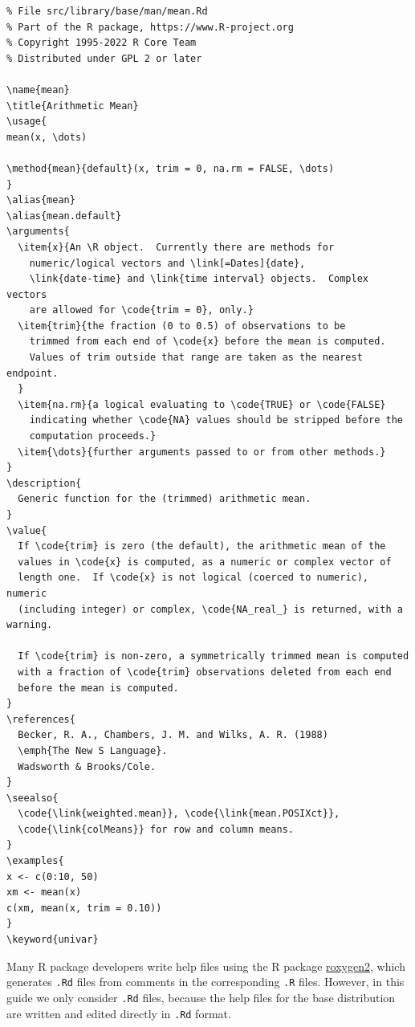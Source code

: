 \documentclass[
]{book}
\begin{document}
\begin{verbatim}
% File src/library/base/man/mean.Rd
% Part of the R package, https://www.R-project.org
% Copyright 1995-2022 R Core Team
% Distributed under GPL 2 or later

\name{mean}
\title{Arithmetic Mean}
\usage{
mean(x, \dots)

\method{mean}{default}(x, trim = 0, na.rm = FALSE, \dots)
}
\alias{mean}
\alias{mean.default}
\arguments{
  \item{x}{An \R object.  Currently there are methods for
    numeric/logical vectors and \link[=Dates]{date},
    \link{date-time} and \link{time interval} objects.  Complex vectors
    are allowed for \code{trim = 0}, only.}
  \item{trim}{the fraction (0 to 0.5) of observations to be
    trimmed from each end of \code{x} before the mean is computed.
    Values of trim outside that range are taken as the nearest endpoint.
  }
  \item{na.rm}{a logical evaluating to \code{TRUE} or \code{FALSE}
    indicating whether \code{NA} values should be stripped before the
    computation proceeds.} 
  \item{\dots}{further arguments passed to or from other methods.}
}
\description{
  Generic function for the (trimmed) arithmetic mean.
}
\value{
  If \code{trim} is zero (the default), the arithmetic mean of the
  values in \code{x} is computed, as a numeric or complex vector of
  length one.  If \code{x} is not logical (coerced to numeric), numeric
  (including integer) or complex, \code{NA_real_} is returned, with a warning.

  If \code{trim} is non-zero, a symmetrically trimmed mean is computed
  with a fraction of \code{trim} observations deleted from each end
  before the mean is computed.
}
\references{
  Becker, R. A., Chambers, J. M. and Wilks, A. R. (1988)
  \emph{The New S Language}.
  Wadsworth & Brooks/Cole.
}
\seealso{
  \code{\link{weighted.mean}}, \code{\link{mean.POSIXct}},
  \code{\link{colMeans}} for row and column means.
}
\examples{
x <- c(0:10, 50)
xm <- mean(x)
c(xm, mean(x, trim = 0.10))
}
\keyword{univar}
\end{verbatim}

Many R package developers write help files using the R package \href{https://cran.r-project.org/package=roxygen2}{roxygen2}, which generates \texttt{.Rd} files from comments in the corresponding \texttt{.R} files. However, in this guide we only consider \texttt{.Rd} files, because the help files for the base distribution are written and edited directly in \texttt{.Rd} format.
\end{document}
